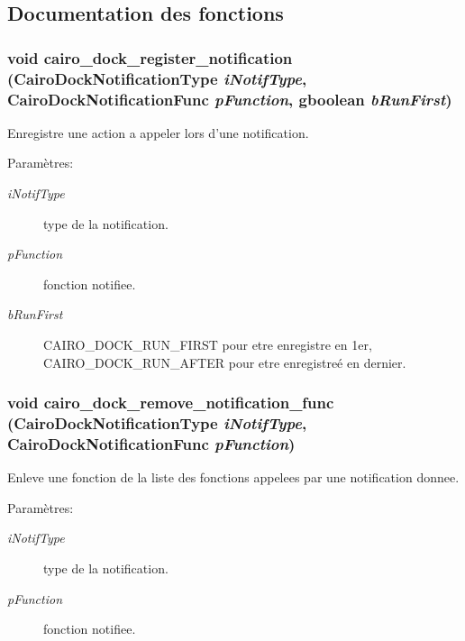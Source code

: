 \subsection{Documentation des fonctions}
\subsubsection{\setlength{\rightskip}{0pt plus 5cm}void cairo\_\-dock\_\-register\_\-notification ({\bf CairoDockNotificationType} {\em iNotifType}, {\bf CairoDockNotificationFunc} {\em pFunction}, gboolean {\em bRunFirst})}\label{cairo-dock-notifications_8h_845e5c4be6a3a3d1be2de99f9c6a93a6}


Enregistre une action a appeler lors d'une notification. \begin{Desc}
\item[Paramètres:]
\begin{description}
\item[{\em iNotifType}]type de la notification. \item[{\em pFunction}]fonction notifiee. \item[{\em bRunFirst}]CAIRO\_\-DOCK\_\-RUN\_\-FIRST pour etre enregistre en 1er, CAIRO\_\-DOCK\_\-RUN\_\-AFTER pour etre enregistreé en dernier. \end{description}
\end{Desc}
\subsubsection{\setlength{\rightskip}{0pt plus 5cm}void cairo\_\-dock\_\-remove\_\-notification\_\-func ({\bf CairoDockNotificationType} {\em iNotifType}, {\bf CairoDockNotificationFunc} {\em pFunction})}\label{cairo-dock-notifications_8h_f91590fc1a8f0f395f4d39c8f6942dc6}


Enleve une fonction de la liste des fonctions appelees par une notification donnee. \begin{Desc}
\item[Paramètres:]
\begin{description}
\item[{\em iNotifType}]type de la notification. \item[{\em pFunction}]fonction notifiee. \end{description}
\end{Desc}
